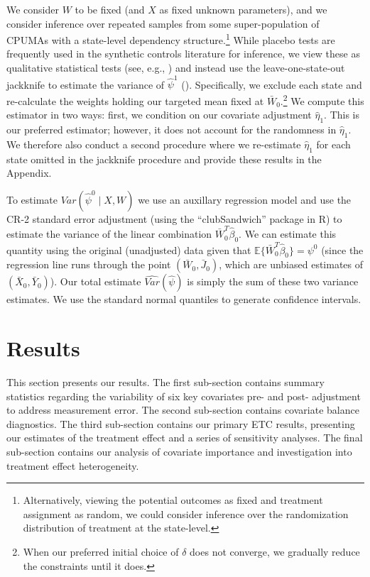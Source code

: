 \documentclass[article]{imsart}
\theoremstyle{plain}
\theoremstyle{remark}
\begin{document}
We consider $W$ to be fixed (and $X$ as fixed unknown parameters), and we consider inference over repeated samples from some super-population of CPUMAs with a state-level dependency structure.\footnote{Alternatively, viewing the potential outcomes as fixed and treatment assignment as random, we could consider inference over the randomization distribution of treatment at the state-level.} While placebo tests are frequently used in the synthetic controls literature for inference, we view these as qualitative statistical tests (see, e.g., \cite{arkhangelsky2019synthetic}) and instead use the leave-one-state-out jackknife to estimate the variance of $\hat{\psi}^1$ (\cite{cameron2015practitioner}). Specifically, we exclude each state and re-calculate the weights holding our targeted mean fixed at $\bar{W}_0$.\footnote{When our preferred initial choice of $\delta$ does not converge, we gradually reduce the constraints until it does.} We compute this estimator in two ways: first, we condition on our covariate adjustment $\hat{\eta}_1$. This is our preferred estimator; however, it does not account for the randomness in $\hat{\eta}_1$. We therefore also conduct a second procedure where we re-estimate $\hat{\eta}_1$ for each state omitted in the jackknife procedure and provide these results in the Appendix.

To estimate $Var(\hat{\psi}^0 \mid X, W)$ we use an auxillary regression model and use the CR-2 standard error adjustment (using the ``clubSandwich'' package in R) to estimate the variance of the linear combination $\bar{W}_0^T\hat{\beta}_0$. We can estimate this quantity using the original (unadjusted) data given that $\mathbb{E}\{\bar{W}_0^T\hat{\beta}_0\} = \psi^0$ (since the regression line runs through the point $(\bar{W}_0, \bar{J}_0)$, which are unbiased estimates of $(\bar{X}_0, \bar{Y}_0)$). Our total estimate $\hat{Var}(\hat{\psi})$ is simply the sum of these two variance estimates. We use the standard normal quantiles to generate confidence intervals. 

\section{Results}

This section presents our results. The first sub-section contains summary statistics regarding the variability of six key covariates pre- and post- adjustment to address measurement error. The second sub-section contains covariate balance diagnostics. The third sub-section contains our primary ETC results, presenting our estimates of the treatment effect and a series of sensitivity analyses. The final sub-section contains our analysis of covariate importance and investigation into treatment effect heterogeneity.
\end{document}
